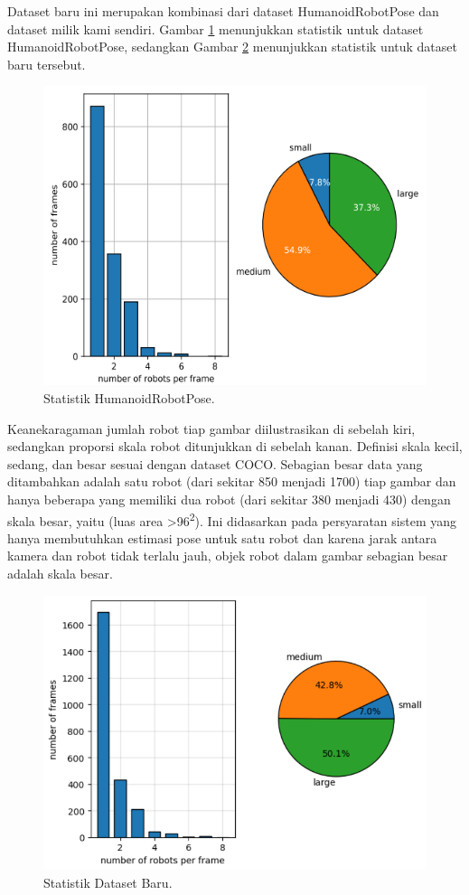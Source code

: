 Dataset baru ini merupakan kombinasi dari dataset HumanoidRobotPose dan dataset milik kami sendiri. Gambar \ref{fig:nimbro-statistics} menunjukkan statistik untuk dataset HumanoidRobotPose, sedangkan Gambar \ref{fig:new-dataset-statistics} menunjukkan statistik untuk dataset baru tersebut.
\begin{figure}[ht]
  \centering
  \includegraphics[scale=0.8]{gambar/old_dataset.png}
  \caption{Statistik HumanoidRobotPose.}
  \label{fig:nimbro-statistics}
\end{figure}
Keanekaragaman jumlah robot tiap gambar diilustrasikan di sebelah kiri, sedangkan proporsi skala robot ditunjukkan di sebelah kanan. Definisi skala kecil, sedang, dan besar sesuai dengan dataset COCO.
Sebagian besar data yang ditambahkan adalah satu robot (dari sekitar 850 menjadi 1700) tiap gambar dan hanya beberapa yang memiliki dua robot (dari sekitar 380 menjadi 430) dengan skala besar, yaitu (luas area \textgreater 96\textsuperscript{2}).
Ini didasarkan pada persyaratan sistem yang hanya membutuhkan estimasi pose untuk satu robot dan karena jarak antara kamera dan robot tidak terlalu jauh, objek robot dalam gambar sebagian besar adalah skala besar.
\begin{figure}[ht]
  \centering
  \includegraphics[scale=0.63]{gambar/new_dataset.png}
  \caption{Statistik Dataset Baru.}
  \label{fig:new-dataset-statistics}
\end{figure}


